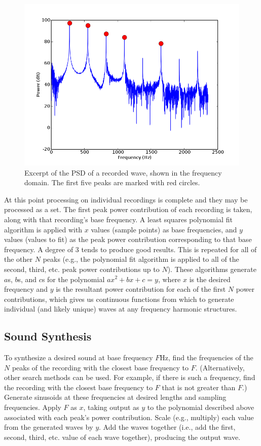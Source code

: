 \documentclass[twocolumn]{article}
\begin{document}
\begin{figure}
\centering
\includegraphics[width=\linewidth]{figures/peaks.png}
\caption{Excerpt of the PSD of a recorded wave, shown in the frequency domain. The first five peaks are marked with red circles.}
\label{peaks}
\end{figure}

At this point processing on individual recordings is complete and they may be processed as a set. The first peak power contribution of each recording is taken, along with that recording's base frequency. A least squares polynomial fit algorithm is applied with $x$ values (sample points) as base frequencies, and $y$ values (values to fit) as the peak power contribution corresponding to that base frequency. A degree of 3 tends to produce good results. This is repeated for all of the other $N$ peaks (e.g., the polynomial fit algorithm is applied to all of the second, third, etc. peak power contributions up to $N$). These algorithms generate $a$s, $b$s, and $c$s for the polynomial $a x^2 + b x + c = y$, where $x$ is the desired frequency and $y$ is the resultant power contribution for each of the first $N$ power contributions, which gives us continuous functions from which to generate individual (and likely unique) waves at any frequency harmonic structures.

\subsection{Sound Synthesis}

To synthesize a desired sound at base frequency $F$Hz, find the frequencies of the $N$ peaks of the recording with the closest base frequency to $F$. (Alternatively, other search methods can be used. For example, if there is such a frequency, find the recording with the closest base frequency to $F$ that is not greater than $F$.) Generate sinusoids at these frequencies at desired lengths and sampling frequencies. Apply $F$ as $x$, taking output as $y$ to the polynomial described above associated with each peak's power contribution. Scale (e.g., multiply) each value from the generated waves by $y$. Add the waves together (i.e., add the first, second, third, etc. value of each wave together), producing the output wave.
\end{document}
